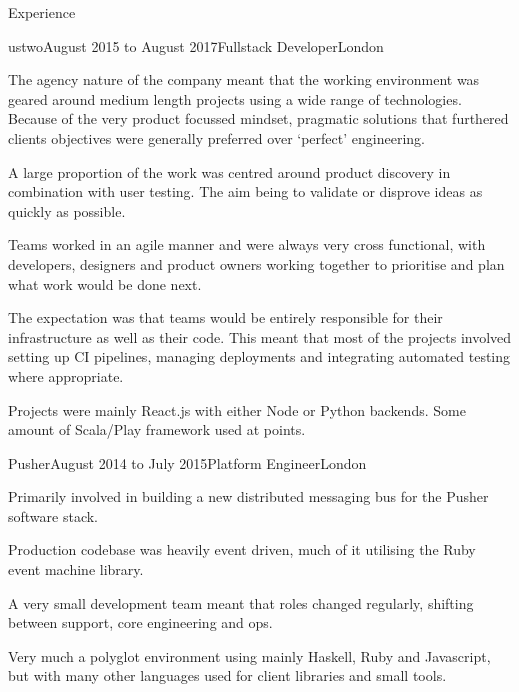 \documentclass{resume} %
\begin{document}

\begin{rSection}{Experience}

  \begin{rExperience}{ustwo}{August 2015 to August 2017}{Fullstack Developer}{London}
  \item The agency nature of the company meant that the working environment was geared around medium length projects using a wide range of technologies. Because of the very product focussed mindset, pragmatic solutions that furthered clients objectives were generally preferred over `perfect' engineering.
  \item A large proportion of the work was centred around product discovery in combination with user testing. The aim being to validate or disprove ideas as quickly as possible.
  \item Teams worked in an agile manner and were always very cross functional, with developers, designers and product owners working together to prioritise and plan what work would be done next.
  \item The expectation was that teams would be entirely responsible for their infrastructure as well as their code. This meant that most of the projects involved setting up CI pipelines, managing deployments and integrating automated testing where appropriate.
  \item Projects were mainly React.js with either Node or Python backends. Some amount of Scala/Play framework used at points.
  \end{rExperience}


  \begin{rExperience}{Pusher}{August 2014 to July 2015}{Platform Engineer}{London}
  \item Primarily involved in building a new distributed messaging bus for the Pusher software stack.
  \item Production codebase was heavily event driven, much of it utilising the Ruby event machine library.
  \item A very small development team meant that roles changed regularly, shifting between support, core engineering and ops.
  \item Very much a polyglot environment using mainly Haskell, Ruby and Javascript, but with many other languages used for client libraries and small tools.
  \end{rExperience}


\end{rSection}
\end{document}
